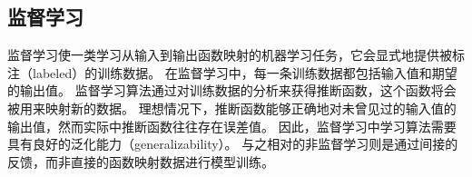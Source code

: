 
\subsection{监督学习}

监督学习使一类学习从输入到输出函数映射的机器学习任务，它会显式地提供被标注（labeled）的训练数据。
在监督学习中，每一条训练数据都包括输入值和期望的输出值。
监督学习算法通过对训练数据的分析来获得推断函数，这个函数将会被用来映射新的数据。
理想情况下，推断函数能够正确地对未曾见过的输入值的输出值，然而实际中推断函数往往存在误差值。
因此，监督学习中学习算法需要具有良好的泛化能力（generalizability）。
与之相对的非监督学习则是通过间接的反馈，而非直接的函数映射数据进行模型训练。


